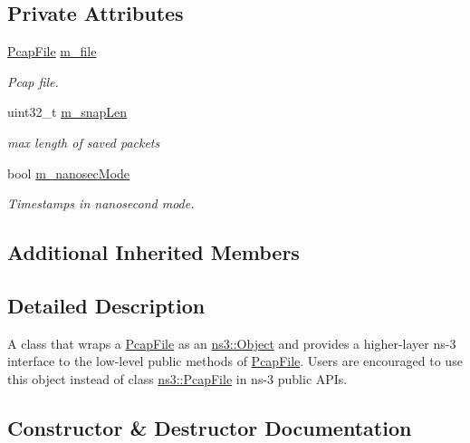 \subsection*{Private Attributes}
\begin{DoxyCompactItemize}
\item 
\hyperlink{classns3_1_1PcapFile}{Pcap\+File} \hyperlink{classns3_1_1PcapFileWrapper_a10e005fc71286fc660bc21c1dd10ad18}{m\+\_\+file}
\begin{DoxyCompactList}\small\item\em Pcap file. \end{DoxyCompactList}\item 
uint32\+\_\+t \hyperlink{classns3_1_1PcapFileWrapper_a3c8cfde5e7aaf2c1ecfef7646a8032db}{m\+\_\+snap\+Len}
\begin{DoxyCompactList}\small\item\em max length of saved packets \end{DoxyCompactList}\item 
bool \hyperlink{classns3_1_1PcapFileWrapper_aefa7cc2c0286d92eb3bfb50cc382f3ff}{m\+\_\+nanosec\+Mode}
\begin{DoxyCompactList}\small\item\em Timestamps in nanosecond mode. \end{DoxyCompactList}\end{DoxyCompactItemize}
\subsection*{Additional Inherited Members}


\subsection{Detailed Description}
A class that wraps a \hyperlink{classns3_1_1PcapFile}{Pcap\+File} as an \hyperlink{classns3_1_1Object}{ns3\+::\+Object} and provides a higher-\/layer ns-\/3 interface to the low-\/level public methods of \hyperlink{classns3_1_1PcapFile}{Pcap\+File}. Users are encouraged to use this object instead of class \hyperlink{classns3_1_1PcapFile}{ns3\+::\+Pcap\+File} in ns-\/3 public A\+P\+Is. 

\subsection{Constructor \& Destructor Documentation}
